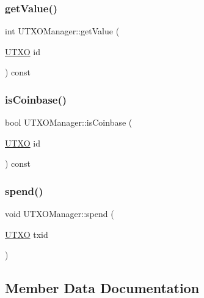 \subsubsection{\texorpdfstring{get\+Value()}{getValue()}}
{\footnotesize\ttfamily int U\+T\+X\+O\+Manager\+::get\+Value (\begin{DoxyParamCaption}\item[{\mbox{\hyperlink{utxo_8hpp_a19091d002da03ec92277e19295ac4540}{U\+T\+XO}}}]{id }\end{DoxyParamCaption}) const}

\mbox{\label{classUTXOManager_a4bcd0b36baf1ed245c48a826db241345}} 
\subsubsection{\texorpdfstring{is\+Coinbase()}{isCoinbase()}}
{\footnotesize\ttfamily bool U\+T\+X\+O\+Manager\+::is\+Coinbase (\begin{DoxyParamCaption}\item[{\mbox{\hyperlink{utxo_8hpp_a19091d002da03ec92277e19295ac4540}{U\+T\+XO}}}]{id }\end{DoxyParamCaption}) const}

\mbox{\label{classUTXOManager_af08863b6400556a6350b3d7122cd1dc4}} 
\subsubsection{\texorpdfstring{spend()}{spend()}}
{\footnotesize\ttfamily void U\+T\+X\+O\+Manager\+::spend (\begin{DoxyParamCaption}\item[{\mbox{\hyperlink{utxo_8hpp_a19091d002da03ec92277e19295ac4540}{U\+T\+XO}}}]{txid }\end{DoxyParamCaption})}



\subsection{Member Data Documentation}
\mbox{\label{classUTXOManager_a41e7280e7d1384aca9dbf2e15b1085cf}} 

